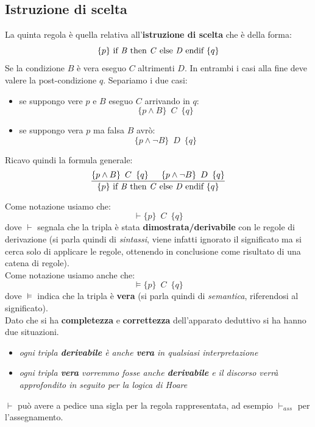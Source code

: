\subsection{Istruzione di scelta}
\begin{definizione}
	La quinta regola è quella relativa all'\textbf{istruzione di scelta} che è
	della forma:
	\[\{p\}\mbox{ if \textit{B} then \textit{C} else \textit{D} endif }\{q\}\]
	Se la condizione $B$ è vera eseguo $C$ altrimenti $D$. In entrambi i casi
	alla fine deve valere la post-condizione $q$. Separiamo i due casi:
	\begin{itemize}
		\item se suppongo vere $p$ e $B$ eseguo $C$ arrivando in $q$:
		      \[\{p\land B\}\,\,\,C\,\,\,\{q\}\]
		\item se suppongo vera $p$ ma falsa $B$ avrò:
		      \[\{p\land \neg B\}\,\,\,D\,\,\,\{q\}\]
	\end{itemize}
	Ricavo quindi la formula generale:
	\begin{align}\label{ChooseRule}
		\frac{\{p\land B\}\,\,\,C\,\,\,\{q\}\,\,\,\,\,\,\,\,\,         
		\{p\land \neg B\}\,\,\,D\,\,\,\{q\}}{\{p\}\mbox{ if \textit{B} 
		then \textit{C} else \textit{D} endif }\{q\}}                  
	\end{align}
\end{definizione}
\begin{shaded}
	Come notazione usiamo che:
	\[\vdash \{p\}\,\,\,C\,\,\,\{q\}\]
	dove $\vdash$
	segnala che la tripla è stata \textbf{dimostrata/derivabile} con le regole di
	derivazione (si parla quindi di \textit{sintassi}, viene infatti ignorato il
	significato ma si cerca solo di applicare le regole, ottenendo in conclusione
	come risultato di una catena di regole).\\
	Come notazione usiamo anche che:
	\[\vDash \{p\}\,\,\,C\,\,\,\{q\}\]
	dove $\vDash$
	indica che la tripla è \textbf{vera} (si parla quindi di \textit{semantica},
	riferendosi al significato).\\
	Dato che si ha \textbf{completezza} e \textbf{correttezza} dell'apparato
	deduttivo si ha hanno due situazioni.
	\begin{itemize}
		\item \textit{ogni tripla \textbf{derivabile} è anche \textbf{vera} in
		qualsiasi interpretazione}
		\item \textit{ogni tripla \textbf{vera} vorremmo fosse anche
		      \textbf{derivabile} e il discorso verrà approfondito in seguito per la
		logica di Hoare}
	\end{itemize}
	$\vdash$ può avere a pedice una sigla per la regola rappresentata, ad esempio
	$\vdash_{ass}$ per l'assegnamento.
\end{shaded}

